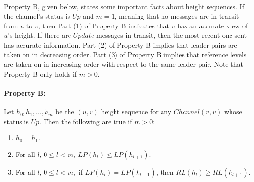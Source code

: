 \paragraph{}Property B, given below, states some important facts about height sequences. If the channel's status is $Up$ and $m = 1$, meaning that no messages are in transit from $u$ to $v$, then Part (1) of Property B indicates that $v$ has an accurate view of $u$'s height. If there are $Update$ messages in transit, then the most recent one sent has accurate information. Part (2) of Property B implies that leader pairs are taken on in decreasing order. Part (3) of Property B implies that reference levels are taken on in increasing order with respect to the same leader pair. Note that Property B only holds if $m > 0$.
\paragraph{Property B:}Let $h_0, h_1, ... , h_m$ be the $(u, v)$ height sequence for any $Channel(u, v)$ whose status is $Up$. Then the following are true if $m > 0$:
\begin{enumerate}
	\item $h_0 = h_1$.
	\item For all $l$, $0 \leq l < m,~LP(h_l ) \leq LP(h_{l+1} )$.
	\item For all $l$, $0 \leq l < m,$ if $LP(h_l ) = LP(h_{l+1})$, then $RL(h_l) \geq RL(h_{l+1})$.
\end{enumerate}
